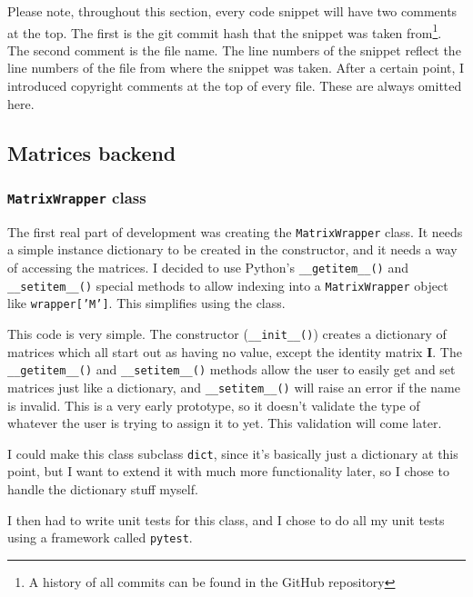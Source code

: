 \documentclass[../main.tex]{subfiles}
\begin{document}
Please note, throughout this section, every code snippet will have two comments at the top. The first is the git commit hash that the snippet was taken from\footnote{A history of all commits can be found in the GitHub repository\cite{lintrans-github}}. The second comment is the file name. The line numbers of the snippet reflect the line numbers of the file from where the snippet was taken. After a certain point, I introduced copyright comments at the top of every file. These are always omitted here.

\subsection{Matrices backend\label{development:matrices-backend}}

\subsubsection{\texttt{MatrixWrapper} class\label{development:matrices-backend:MatrixWrapper-class}}

The first real part of development was creating the \texttt{MatrixWrapper} class. It needs a simple instance dictionary to be created in the constructor, and it needs a way of accessing the matrices. I decided to use Python's \texttt{\_\_getitem\_\_()} and \texttt{\_\_setitem\_\_()} special methods\cite{python-3-special-methods} to allow indexing into a \texttt{MatrixWrapper} object like \texttt{wrapper['M']}. This simplifies using the class.


This code is very simple. The constructor (\texttt{\_\_init\_\_()}) creates a dictionary of matrices which all start out as having no value, except the identity matrix \textbf{I}. The \texttt{\_\_getitem\_\_()} and \texttt{\_\_setitem\_\_()} methods allow the user to easily get and set matrices just like a dictionary, and \texttt{\_\_setitem\_\_()} will raise an error if the name is invalid. This is a very early prototype, so it doesn't validate the type of whatever the user is trying to assign it to yet. This validation will come later.

I could make this class subclass \texttt{dict}, since it's basically just a dictionary at this point, but I want to extend it with much more functionality later, so I chose to handle the dictionary stuff myself.

I then had to write unit tests for this class, and I chose to do all my unit tests using a framework called \texttt{pytest}.
\end{document}
